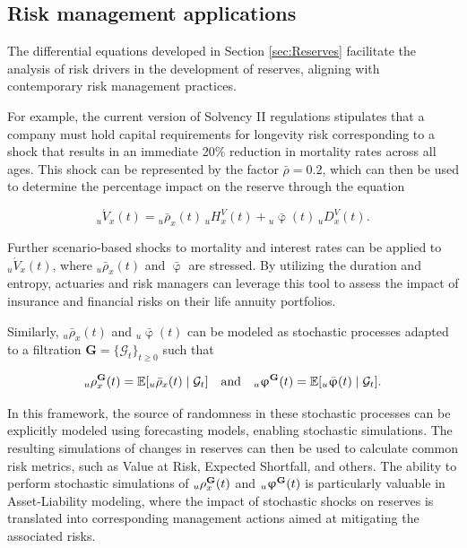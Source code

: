 \documentclass[12pt]{article}
\begin{document}
{\subsection{Risk management applications}

The differential equations developed in Section \ref{sec:Reserves} facilitate the analysis of risk drivers in the development of reserves, aligning with contemporary risk management practices.

For example, the current version of Solvency II regulations stipulates that a company must hold capital requirements for longevity risk corresponding to a shock that results in an immediate 20\% reduction in mortality rates across all ages. This shock can be represented by the factor \( \bar{\rho} = 0.2 \), which can then be used to determine the percentage impact on the reserve through the equation 

\[
{}_u\acute{V}_x(t) = {}_u\bar{\rho}_x(t) \, {}_uH_x^V(t) + {}_u\bar{\upvarphi}(t) \, {}_uD_x^V(t).
\]

Further scenario-based shocks to mortality and interest rates can be applied to \( {}_u\acute{V}_x(t) \), where \( {}_u\bar{\rho}_x(t) \) and \( \bar{\upvarphi} \) are stressed. By utilizing the duration and entropy, actuaries and risk managers can leverage this tool to assess the impact of insurance and financial risks on their life annuity portfolios.

Similarly, \( {}_u\bar{\rho}_x(t) \) and \( {}_u\bar{\upvarphi}(t) \) can be modeled as stochastic processes adapted to a filtration \( \textbf{G} = \{\mathcal{G}_t\}_{t \ge 0} \) such that 

\[
{}_u{\rho}^{\bf{G}}_x(t) = \mathbb{E}[{}_u\bar{\rho}_x(t) \mid \mathcal{G}_t] \quad \text{and} \quad {}_u{\upvarphi}^{\bf{G}}(t) = \mathbb{E}[{}_u\bar{\upvarphi}(t) \mid \mathcal{G}_t].
\]

In this framework, the source of randomness in these stochastic processes can be explicitly modeled using forecasting models, enabling stochastic simulations. The resulting simulations of changes in reserves can then be used to calculate common risk metrics, such as Value at Risk, Expected Shortfall, and others. The ability to perform stochastic simulations of \( {}_u{\rho}^{\bf{G}}_x(t) \) and \( {}_u{\upvarphi}^{\bf{G}}(t) \) is particularly valuable in Asset-Liability modeling, where the impact of stochastic shocks on reserves is translated into corresponding management actions aimed at mitigating the associated risks.

}
\end{document}
